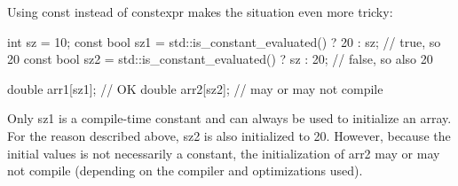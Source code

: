 Using const instead of constexpr makes the situation even more tricky:

\begin{cpp}
int sz = 10;
const bool sz1 = std::is_constant_evaluated() ? 20 : sz; // true, so 20
const bool sz2 = std::is_constant_evaluated() ? sz : 20; // false, so also 20

double arr1[sz1]; // OK
double arr2[sz2]; // may or may not compile
\end{cpp}

Only sz1 is a compile-time constant and can always be used to initialize an array. For the reason described above, sz2 is also initialized to 20. However, because the initial values is not necessarily a constant, the initialization of arr2 may or may not compile (depending on the compiler and optimizations used).


















